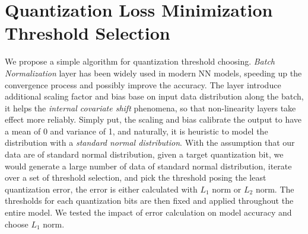 \section{Quantization Loss Minimization Threshold Selection}
We propose a simple algorithm for quantization threshold choosing. \textit{Batch Normalization} layer \cite{BatchNormalization} has been widely used in modern NN models, speeding up the convergence process and possibly improve the accuracy. The layer introduce additional scaling factor and bias base on input data distribution along the batch, it helps the \textit{internal covariate shift} phenomena, so that non-linearity layers take effect more reliably. Simply put, the scaling and bias calibrate the output to have a mean of 0 and variance of 1, and naturally, it is heuristic to model the distribution with a \textit{standard normal distribution}. With the assumption that our data are of standard normal distribution, given a target quantization bit, we would generate a large number of data of standard normal distribution, iterate over a set of threshold selection, and pick the threshold posing the least quantization error, the error is either calculated with \textit{$L_1$} norm or \textit{$L_2$} norm. The thresholds for each quantization bits are then fixed and applied throughout the entire model. We tested the impact of error calculation on model accuracy and choose \textit{$L_1$} norm. 

